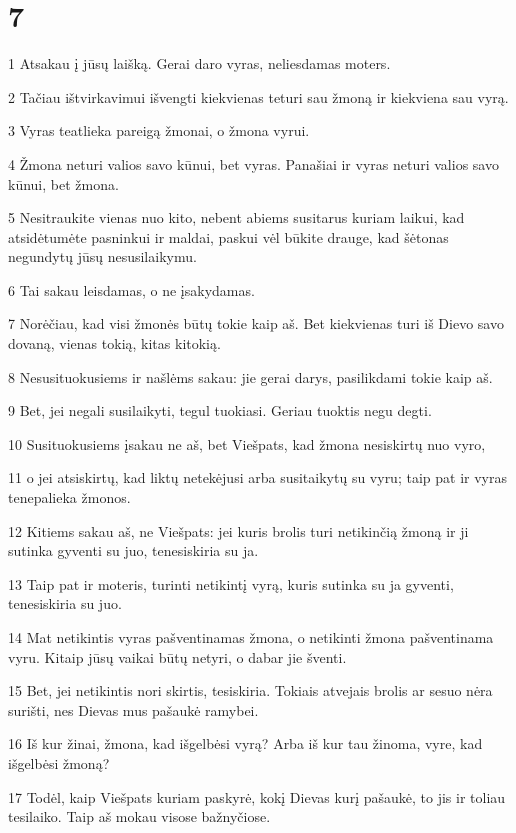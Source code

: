\chapter{7}


\par 1 Atsakau į jūsų laišką. Gerai daro vyras, neliesdamas moters. 
\par 2 Tačiau ištvirkavimui išvengti kiekvienas teturi sau žmoną ir kiekviena sau vyrą. 
\par 3 Vyras teatlieka pareigą žmonai, o žmona vyrui. 
\par 4 Žmona neturi valios savo kūnui, bet vyras. Panašiai ir vyras neturi valios savo kūnui, bet žmona. 
\par 5 Nesitraukite vienas nuo kito, nebent abiems susitarus kuriam laikui, kad atsidėtumėte pasninkui ir maldai, paskui vėl būkite drauge, kad šėtonas negundytų jūsų nesusilaikymu. 
\par 6 Tai sakau leisdamas, o ne įsakydamas. 
\par 7 Norėčiau, kad visi žmonės būtų tokie kaip aš. Bet kiekvienas turi iš Dievo savo dovaną, vienas tokią, kitas kitokią. 
\par 8 Nesusituokusiems ir našlėms sakau: jie gerai darys, pasilikdami tokie kaip aš. 
\par 9 Bet, jei negali susilaikyti, tegul tuokiasi. Geriau tuoktis negu degti. 
\par 10 Susituokusiems įsakau ne aš, bet Viešpats, kad žmona nesiskirtų nuo vyro, 
\par 11 o jei atsiskirtų, kad liktų netekėjusi arba susitaikytų su vyru;­ taip pat ir vyras tenepalieka žmonos. 
\par 12 Kitiems sakau aš, ne Viešpats: jei kuris brolis turi netikinčią žmoną ir ji sutinka gyventi su juo, tenesiskiria su ja. 
\par 13 Taip pat ir moteris, turinti netikintį vyrą, kuris sutinka su ja gyventi, tenesiskiria su juo. 
\par 14 Mat netikintis vyras pašventinamas žmona, o netikinti žmona pašventinama vyru. Kitaip jūsų vaikai būtų netyri, o dabar jie šventi. 
\par 15 Bet, jei netikintis nori skirtis, tesiskiria. Tokiais atvejais brolis ar sesuo nėra surišti, nes Dievas mus pašaukė ramybei. 
\par 16 Iš kur žinai, žmona, kad išgelbėsi vyrą? Arba iš kur tau žinoma, vyre, kad išgelbėsi žmoną? 
\par 17 Todėl, kaip Viešpats kuriam paskyrė, kokį Dievas kurį pašaukė, to jis ir toliau tesilaiko. Taip aš mokau visose bažnyčiose. 
